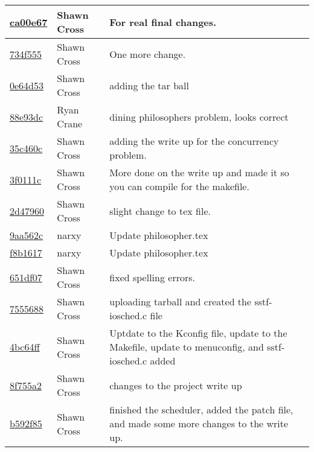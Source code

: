 \begin{tabular}{l l l}
\href{https://github.com/crosssh/CS444/commit/ca00e679905ff0ddd7becab23c88f33826e35db8}{ca00e67} & Shawn Cross & For real final changes.\\\hline
\href{https://github.com/crosssh/CS444/commit/734f5557a5019357f359d31c2b8460e75f5a90db}{734f555} & Shawn Cross & One more change.\\\hline
\href{https://github.com/crosssh/CS444/commit/0e64d532dc7d152515db587be631cfb8969a80ad}{0e64d53} & Shawn Cross & adding the tar ball\\\hline
\href{https://github.com/crosssh/CS444/commit/88e93dc7f5e10022f61dcc02707ab977045d02f0}{88e93dc} & Ryan Crane & dining philosophers problem, looks correct\\\hline
\href{https://github.com/crosssh/CS444/commit/35c460c5834e37d3b7763cb8cf924fd1c60605aa}{35c460c} & Shawn Cross & adding the write up for the concurrency problem.\\\hline
\href{https://github.com/crosssh/CS444/commit/3f0111c4029242fbff1abdbca709846e312de5e3}{3f0111c} & Shawn Cross & More done on the write up and made it so you can compile for the makefile.\\\hline
\href{https://github.com/crosssh/CS444/commit/2d479602bacb4413c4926dc4d291da1999f4543c}{2d47960} & Shawn Cross & slight change to tex file.\\\hline
\href{https://github.com/crosssh/CS444/commit/9aa562c78ee7ab1d2c149a0a110375449b559d34}{9aa562c} & narxy & Update philosopher.tex\\\hline
\href{https://github.com/crosssh/CS444/commit/f8b1617c75f383036ef25a3ac7a69fd1960cee15}{f8b1617} & narxy & Update philosopher.tex\\\hline
\href{https://github.com/crosssh/CS444/commit/651df07401865b4a7a8b049a5bb170d350407c4d}{651df07} & Shawn Cross & fixed spelling errors.\\\hline
\href{https://github.com/crosssh/CS444/commit/75556889aec755f28b25f1c81b86fb31c7ff825c}{7555688} & Shawn Cross & uploading tarball and created the sstf-iosched.c file\\\hline
\href{https://github.com/crosssh/CS444/commit/4bc64ff20f38125e7a8d84f16e1780b235ff3519}{4bc64ff} & Shawn Cross & Uptdate to the Kconfig file, update to the Makefile, update to menuconfig, and sstf-iosched.c added\\\hline
\href{https://github.com/crosssh/CS444/commit/8f755a26af96f2442f987c1b32698b28f3ce6783}{8f755a2} & Shawn Cross & changes to the project write up\\\hline
\href{https://github.com/crosssh/CS444/commit/b592f85de6764a1ddc53481919fa2f66ecc94bae}{b592f85} & Shawn Cross & finished the scheduler, added the patch file, and made some more changes to the write up.\\\hline

\end{tabular}
